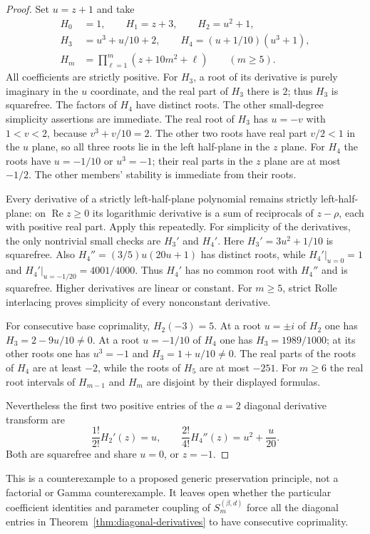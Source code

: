 \documentclass[11pt]{article}
\begin{document}
\begin{proof}
Set $u=z+1$ and take
\[
 \begin{split}
 H_0&=1,\qquad H_1=z+3,\qquad H_2=u^2+1,\\
 H_3&=u^3+u/10+2,\qquad H_4=(u+1/10)(u^3+1),\\
 H_m&=\prod_{\ell=1}^m(z+10m^2+\ell)\qquad(m\ge5).
 \end{split}
\]
All coefficients are strictly positive. For $H_3$, a root of its derivative is purely imaginary in the $u$
coordinate, and the real part of $H_3$ there is $2$; thus $H_3$ is
squarefree. The factors of $H_4$ have distinct roots. The other
small-degree simplicity assertions are immediate. The real root of $H_3$ has $u=-v$ with $1<v<2$,
because $v^3+v/10=2$. The other two roots have real part $v/2<1$
in the $u$ plane, so all three roots lie in the left half-plane
in the $z$ plane. For $H_4$ the roots have $u=-1/10$ or $u^3=-1$;
their real parts in the $z$ plane are at most $-1/2$.
The other members' stability is immediate from their roots.

Every derivative of a strictly left-half-plane polynomial remains
strictly left-half-plane: on $\operatorname{Re}z\ge0$ its logarithmic
derivative is a sum of reciprocals of $z-\rho$, each with positive
real part. Apply this repeatedly.
For simplicity of the derivatives, the only nontrivial small checks
are $H_3'$ and $H_4'$.
Here $H_3'=3u^2+1/10$ is squarefree.
Also $H_4''=(3/5)u(20u+1)$ has distinct roots, while
$H_4'|_{u=0}=1$ and $H_4'|_{u=-1/20}=4001/4000$.
Thus $H_4'$ has no common root with $H_4''$ and is squarefree.
Higher derivatives are linear or constant.
For $m\ge5$, strict Rolle interlacing proves simplicity of every
nonconstant derivative.

For consecutive base coprimality, $H_2(-3)=5$.
At a root $u=\pm i$ of $H_2$ one has
$H_3=2-9u/10\ne0$.
At a root $u=-1/10$ of $H_4$ one has $H_3=1989/1000$;
at its other roots one has $u^3=-1$ and $H_3=1+u/10\ne0$.
The real parts of the roots of $H_4$ are at least $-2$, while the
roots of $H_5$ are at most $-251$.
For $m\ge6$ the real root intervals of $H_{m-1}$ and $H_m$
are disjoint by their displayed formulas.

Nevertheless the first two positive entries of the $a=2$ diagonal
derivative transform are
\[
 \frac{1!}{2!}H_2'(z)=u,\qquad
 \frac{2!}{4!}H_4''(z)=u^2+\frac{u}{20}.
\]
Both are squarefree and share $u=0$, or $z=-1$.
\end{proof}
This is a counterexample to a proposed generic preservation principle,
not a factorial or Gamma counterexample. It leaves open whether the
particular coefficient identities and parameter coupling of
$S_m^{(\beta,d)}$ force all the diagonal entries in
Theorem~\ref{thm:diagonal-derivatives} to have consecutive coprimality.
\end{document}
